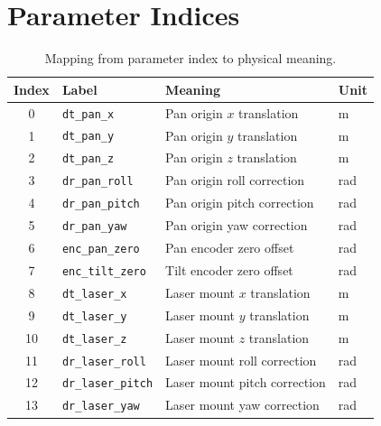 \documentclass[12pt,a4paper]{article}
\newcommand{\code}[1]{\texttt{#1}}
\begin{document}
\section{Parameter Indices}
\label{app:param_indices}

\begin{table}[H]
\centering
\caption{Mapping from parameter index to physical meaning.}
\label{tab:param_index}
\begin{tabular}{@{}clll@{}}
\toprule
Index & Label & Meaning & Unit \\
\midrule
0  & \code{dt\_pan\_x}   & Pan origin $x$ translation & m \\
1  & \code{dt\_pan\_y}   & Pan origin $y$ translation & m \\
2  & \code{dt\_pan\_z}   & Pan origin $z$ translation & m \\
3  & \code{dr\_pan\_roll}  & Pan origin roll correction & rad \\
4  & \code{dr\_pan\_pitch} & Pan origin pitch correction & rad \\
5  & \code{dr\_pan\_yaw}   & Pan origin yaw correction & rad \\
6  & \code{enc\_pan\_zero}   & Pan encoder zero offset & rad \\
7  & \code{enc\_tilt\_zero}  & Tilt encoder zero offset & rad \\
8  & \code{dt\_laser\_x}  & Laser mount $x$ translation & m \\
9  & \code{dt\_laser\_y}  & Laser mount $y$ translation & m \\
10 & \code{dt\_laser\_z}  & Laser mount $z$ translation & m \\
11 & \code{dr\_laser\_roll}  & Laser mount roll correction & rad \\
12 & \code{dr\_laser\_pitch} & Laser mount pitch correction & rad \\
13 & \code{dr\_laser\_yaw}   & Laser mount yaw correction & rad \\
\bottomrule
\end{tabular}
\end{table}
\end{document}
